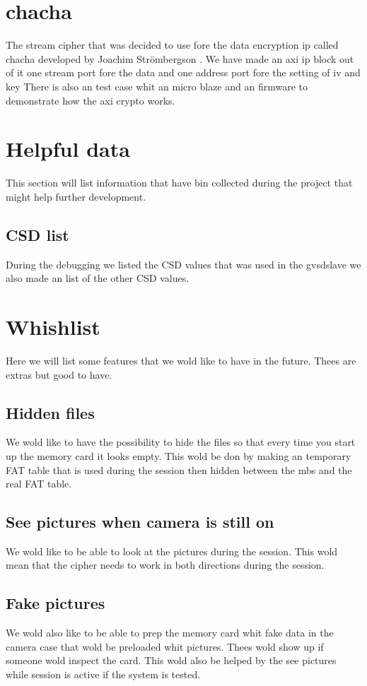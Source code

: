 \documentclass[]{article}
\begin{document}
\section{chacha}
The stream cipher that was decided to use fore the data encryption ip called chacha \cite{chacha} developed by Joachim Strömbergson \cite{joachim}.  
We have made an axi ip block out of it one stream port fore the data and one address port fore the setting of iv and key 
There is also an test case whit an micro blaze and an firmware to demonstrate how the axi crypto works.  


\section{Helpful data}
This section will list information that have bin collected during the project that might help further development.

\subsection{CSD list}
During the debugging we listed the CSD values that was used in the \gls{gvsdslave} we also made an list of the other CSD values.

\section{Whishlist}
Here we will list some features that we wold like to have in the future.
Thees are extras but good to have.

\subsection{Hidden files}
We wold like to have the possibility to hide the files so that every time you start up the memory card it looks empty.
This wold be don by making an temporary FAT table that is used during the session then hidden between the \gls{mbs} and the real FAT table.

\subsection{See pictures when camera is still on}
We wold like to be able to look at the pictures during the session.
This wold mean that the cipher needs to work in both directions during the session.

\subsection{Fake pictures}
We wold also like to be able to prep the memory card whit fake data in the camera case that wold be preloaded whit pictures.
Thees wold show up if someone wold inspect the card.
This wold also be helped by the see pictures while session is active if the system is tested.



\clearpage
\newpage
\printglossary[type=\acronymtype]
\printnoidxglossaries


{}

\end{document}
